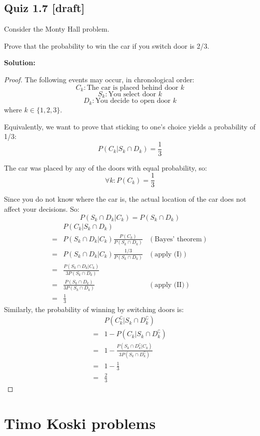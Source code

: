 \documentclass{article}
\begin{document}
\subsection{Quiz 1.7 [draft]}

Consider the Monty Hall problem.

Prove that the probability to win the car if you switch door is 2/3.

\textbf{Solution:}

\begin{proof}
The following events may occur, in chronological order:
\[C_k: \text{The car is placed behind door }k\]
\[S_k: \text{You select door }k\]
\[D_k: \text{You decide to open door }k\]
where \(k\in \{1,2,3\}\).

Equivalently, we want to prove that sticking to one's choice yields a probability of 1/3:
\[P(C_k|S_k \cap D_k)=\frac{1}{3}\]

The car was placed by any of the doors with equal probability, so:
\[\forall k: P(C_k)=\frac13\tag{I}\]

Since you do not know where the car is, the actual location of the car does not affect your decisions. So:
\[P(S_k\cap D_k|C_k)=P(S_k\cap D_k)\tag{II}\]
\begin{align*}
     & P(C_k|S_k\cap D_k) \\
    =& P(S_k\cap D_k|C_k)\frac{P(C_k)}{P(S_k\cap D_k)} & (\text{Bayes' theorem}) \\
    =& P(S_k\cap D_k|C_k)\frac{1/3}{P(S_k\cap D_k)} & (\text{apply (I)}) \\
    =& \frac{P(S_k\cap D_k|C_k)}{3P(S_k\cap D_k)} \\
    =& \frac{P(S_k\cap D_k)}{3P(S_k\cap D_k)} & (\text{apply (II)}) \\
    =& \frac{1}{3}
\end{align*}
Similarly, the probability of winning by switching doors is:
\begin{align*}
     & P(C_k^\complement|S_k\cap D_k^\complement) \\
    =& 1-P(C_k|S_k\cap D_k^\complement) \\
    =& 1-\frac{P(S_k\cap D_k^\complement|C_k)}{3P(S_k\cap D_k^\complement)} \\
    =& 1-\frac{1}{3} \\
    =& \frac{2}{3}
\end{align*}
\end{proof}

\section{Timo Koski problems}
\end{document}
